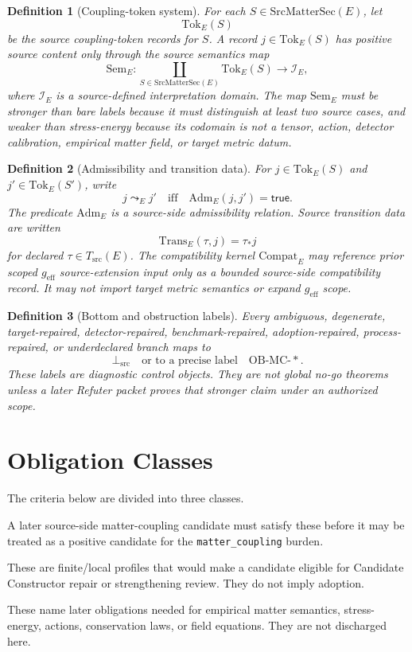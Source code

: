 \documentclass[11pt]{article}
\newcommand{\geff}{g_{\mathrm{eff}}}
\newcommand{\BottomSrc}{\bot_{\mathrm{src}}}
\newcommand{\SrcMatterSec}{\mathrm{SrcMatterSec}}
\newcommand{\Tok}{\mathrm{Tok}}
\newcommand{\Sem}{\mathrm{Sem}}
\newcommand{\Adm}{\mathrm{Adm}}
\newcommand{\Trans}{\mathrm{Trans}}
\newcommand{\Compat}{\mathrm{Compat}}
\newcommand{\OBMC}{\mathrm{OB}\mbox{-}\mathrm{MC}}
\newtheorem{definition}{Definition}
\begin{document}
\begin{definition}[Coupling-token system]
For each \(S\in\SrcMatterSec(E)\), let
\[
  \Tok_E(S)
\]
be the source coupling-token records for \(S\). A record
\(j\in\Tok_E(S)\) has positive source content only through the source
semantics map
\[
  \Sem_E:\coprod_{S\in\SrcMatterSec(E)}\Tok_E(S)\to \mathcal{I}_E,
\]
where \(\mathcal{I}_E\) is a source-defined interpretation domain. The map
\(\Sem_E\) must be stronger than bare labels because it must distinguish at
least two source cases, and weaker than stress-energy because its codomain is
not a tensor, action, detector calibration, empirical matter field, or target
metric datum.
\end{definition}

\begin{definition}[Admissibility and transition data]
For \(j\in\Tok_E(S)\) and \(j'\in\Tok_E(S')\), write
\[
  j\leadsto_E j'
  \quad\text{iff}\quad
  \Adm_E(j,j')=\mathsf{true}.
\]
The predicate \(\Adm_E\) is a source-side admissibility relation. Source
transition data are written
\[
  \Trans_E(\tau,j)=\tau_\ast j
\]
for declared \(\tau\in T_{\mathrm{src}}(E)\). The compatibility kernel
\(\Compat_E\) may reference prior scoped \(\geff\) source-extension input only
as a bounded source-side compatibility record. It may not import target metric
semantics or expand \(\geff\) scope.
\end{definition}

\begin{definition}[Bottom and obstruction labels]
Every ambiguous, degenerate, target-repaired, detector-repaired,
benchmark-repaired, adoption-repaired, process-repaired, or underdeclared
branch maps to
\[
  \BottomSrc
  \quad\text{or to a precise label}\quad
  \OBMC\mbox{-}\ast .
\]
These labels are diagnostic control objects. They are not global no-go
theorems unless a later Refuter packet proves that stronger claim under an
authorized scope.
\end{definition}

\section{Obligation Classes}

The criteria below are divided into three classes.

\begin{description}[leftmargin=*]
  \item[Necessary criteria.] A later source-side matter-coupling candidate
  must satisfy these before it may be treated as a positive candidate for the
  \texttt{matter\_coupling} burden.
  \item[Candidate sufficient profiles.] These are finite/local profiles that
  would make a candidate eligible for Candidate Constructor repair or
  strengthening review. They do not imply adoption.
  \item[Future physical bridge obligations.] These name later obligations
  needed for empirical matter semantics, stress-energy, actions, conservation
  laws, or field equations. They are not discharged here.
\end{description}
\end{document}
